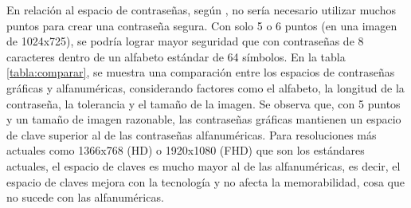 \documentclass[12pt]{report}
\begin{document}
	 

	
	En relación al espacio de contraseñas, según \cite{1}, no sería necesario utilizar muchos puntos para crear una contraseña segura. Con solo 5 o 6 puntos (en una imagen de 1024x725), se podría lograr mayor seguridad que con contraseñas de 8 caracteres dentro de un alfabeto estándar de 64 símbolos. En la tabla \ref{tabla:comparar}, se muestra una comparación entre los espacios de contraseñas gráficas y alfanuméricas, considerando factores como el alfabeto, la longitud de la contraseña, la tolerancia y el tamaño de la imagen. Se observa que, con 5 puntos y un tamaño de imagen razonable, las contraseñas gráficas mantienen un espacio de clave superior al de las contraseñas alfanuméricas. Para resoluciones más actuales como 1366x768 (HD) o 1920x1080 (FHD) que son los estándares actuales, el espacio de claves  es mucho mayor al de las alfanuméricas, es decir, el espacio de claves mejora con la tecnología y no afecta la memorabilidad, cosa que no sucede con las alfanuméricas.
	
\end{document}
